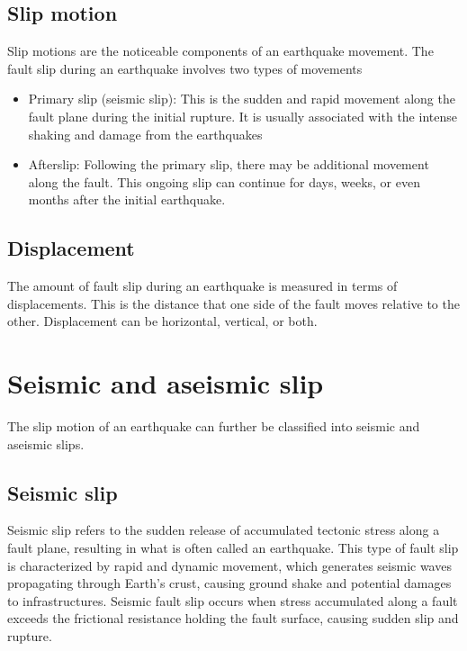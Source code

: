 \subsection{Slip motion}
Slip motions are the noticeable components of an earthquake movement.
The fault slip during an earthquake involves two types of movements
\begin{itemize}
    \item Primary slip (seismic slip): This is the sudden and rapid movement along the fault plane during the initial rupture. It is usually associated with the intense shaking and damage from the earthquakes
    \item Afterslip: Following the primary slip, there may be additional movement along the fault. This ongoing slip can continue for days, weeks, or even months after the initial earthquake.
\end{itemize}

\subsection{Displacement}
The amount of fault slip during an earthquake is measured in terms of displacements. 
This is the distance that one side of the fault moves relative to the other.
Displacement can be horizontal, vertical, or both.


\section{Seismic and aseismic slip}
The slip motion of an earthquake can further be classified into seismic and aseismic slips.
\subsection{Seismic slip}
Seismic slip refers to the sudden release of accumulated tectonic stress along a fault plane, resulting in what is often called an earthquake.
This type of fault slip is characterized by rapid and dynamic movement, which generates seismic waves propagating through Earth's crust, causing ground shake and potential damages to infrastructures.
Seismic fault slip occurs when stress accumulated along a fault exceeds the frictional resistance holding the fault surface, causing sudden slip and rupture.
